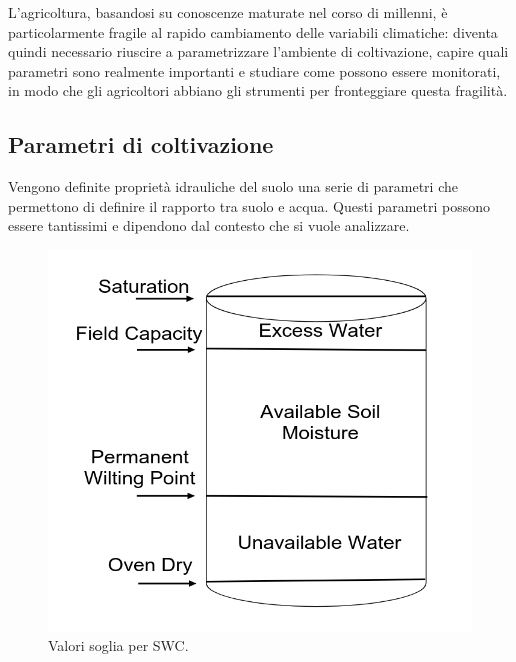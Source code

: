 \documentclass[12pt,a4paper,openright,twoside]{book}
\begin{document}
L'agricoltura, basandosi su conoscenze maturate nel corso di millenni, è particolarmente fragile al rapido cambiamento delle variabili climatiche\cite{Janani2024}: diventa quindi necessario riuscire a parametrizzare l'ambiente di coltivazione, capire quali parametri sono realmente importanti e studiare come possono essere monitorati, in modo che gli agricoltori abbiano gli strumenti per fronteggiare questa fragilità\cite{Monteleone2023}.

\subsection{Parametri di coltivazione}\label{parametri-coltivazione}

Vengono definite proprietà idrauliche del suolo una serie di parametri che permettono di definire il rapporto tra suolo e acqua. Questi parametri possono essere tantissimi e dipendono dal contesto che si vuole analizzare.
\begin{figure}
    \centering
    \includegraphics[width=0.5\linewidth]{./figures/SWC-costants.png}
    \caption{Valori soglia per \ac{SWC}\cite{Ding2022}.}
    \label{fig.SWC-costants}
\end{figure}
\end{document}
